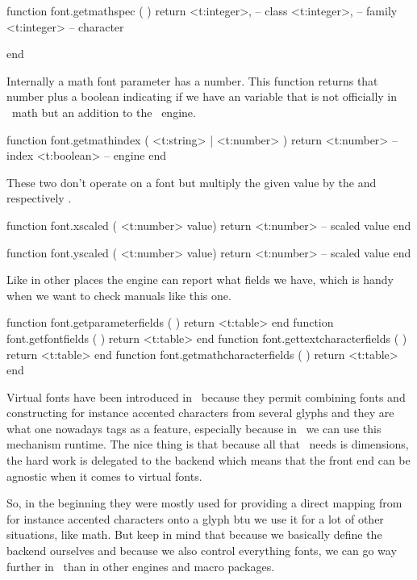 {\starttyping [option=LUA]
function font.getmathspec ( )
    return
        <t:integer>, -- class
        <t:integer>, -- family
        <t:integer>  -- character

end
\stoptyping

Internally a math font parameter has a number. This function returns that number
plus a boolean indicating if we have an variable that is not officially in
\OPENTYPE\ math but an addition to the \LUAMETATEX\ engine.

\starttyping [option=LUA]
function font.getmathindex ( <t:string> | <t:number> )
    return
        <t:number>  -- index
        <t:boolean> -- engine
end
\stoptyping

These two don't operate on a font but multiply the given value by the \type
{\glyphscale} and \type {\glyphxscale} respectively
\type {\glyphyscale}.

\starttyping [option=LUA]
function font.xscaled ( <t:number> value)
    return <t:number> -- scaled value
end
\stoptyping

\starttyping [option=LUA]
function font.yscaled ( <t:number> value)
    return <t:number> -- scaled value
end
\stoptyping

Like in other places the engine can report what fields we have, which is handy
when we want to check manuals like this one.

\starttyping [option=LUA]
function font.getparameterfields     ( ) return <t:table> end
function font.getfontfields          ( ) return <t:table> end
function font.gettextcharacterfields ( ) return <t:table> end
function font.getmathcharacterfields ( ) return <t:table> end
\stoptyping

\stopsection

\startsection[title={Virtual fonts}]

Virtual fonts have been introduced in \TEX\ because they permit combining fonts
and constructing for instance accented characters from several glyphs and they
are what one nowadays tags as a  feature, especially because in
\LUATEX\ we can use this mechanism runtime. The nice thing is that because all
that \TEX\ needs is dimensions, the hard work is delegated to the backend which
means that the front end can be agnostic when it comes to virtual fonts.

So, in the beginning they were mostly used for providing a direct mapping from
for instance accented characters onto a glyph btu we use it for a lot of other
situations, like math. But keep in mind that because we basically define the
backend ourselves and because we also control everything fonts, we can go way
further in \CONTEXT\ than in other engines and macro packages.

}
